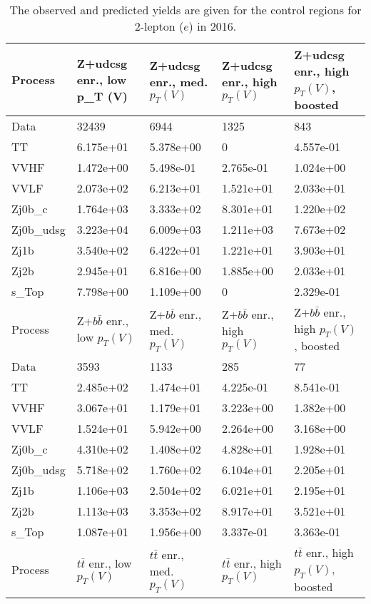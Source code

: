 \begin{table}
\centering
\caption[2016 2-lepton ($e$) control region yields]{
                  The observed and predicted yields are given for the
                  control regions for 2-lepton ($e$) in 2016.
                  }
{\footnotesize
\begin{tabularx}{\textwidth}{|X|X|X|X|X|}
\hline
Process & Z+udcsg enr., low p_{T} (V) & Z+udcsg enr., med. $p_{T}(V)$ & Z+udcsg enr., high $p_{T}(V)$ & Z+udcsg enr., high $p_{T}(V)$, boosted \\
\hline
Data & 32439 & 6944 & 1325 & 843 \\
\hline
TT & 6.175e+01 & 5.378e+00 & 0 & 4.557e-01 \\
VVHF & 1.472e+00 & 5.498e-01 & 2.765e-01 & 1.024e+00 \\
VVLF & 2.073e+02 & 6.213e+01 & 1.521e+01 & 2.033e+01 \\
Zj0b\_c & 1.764e+03 & 3.333e+02 & 8.301e+01 & 1.220e+02 \\
Zj0b\_udsg & 3.223e+04 & 6.009e+03 & 1.211e+03 & 7.673e+02 \\
Zj1b & 3.540e+02 & 6.422e+01 & 1.221e+01 & 3.903e+01 \\
Zj2b & 2.945e+01 & 6.816e+00 & 1.885e+00 & 2.033e+01 \\
s\_Top & 7.798e+00 & 1.109e+00 & 0 & 2.329e-01 \\
\hline
\hline
Process & Z+$b\bar{b}$ enr., low $p_{T}(V)$ & Z+$b\bar{b}$ enr., med. $p_{T}(V)$ & Z+$b\bar{b}$ enr., high $p_{T}(V)$ & Z+$b\bar{b}$ enr., high $p_{T}(V)$, boosted \\
\hline
Data & 3593 & 1133 & 285 & 77 \\
\hline
TT & 2.485e+02 & 1.474e+01 & 4.225e-01 & 8.541e-01 \\
VVHF & 3.067e+01 & 1.179e+01 & 3.223e+00 & 1.382e+00 \\
VVLF & 1.524e+01 & 5.942e+00 & 2.264e+00 & 3.168e+00 \\
Zj0b\_c & 4.310e+02 & 1.408e+02 & 4.828e+01 & 1.928e+01 \\
Zj0b\_udsg & 5.718e+02 & 1.760e+02 & 6.104e+01 & 2.205e+01 \\
Zj1b & 1.106e+03 & 2.504e+02 & 6.021e+01 & 2.195e+01 \\
Zj2b & 1.113e+03 & 3.353e+02 & 8.917e+01 & 3.521e+01 \\
s\_Top & 1.087e+01 & 1.956e+00 & 3.337e-01 & 3.363e-01 \\
\hline
\hline
Process & $t\bar{t}$ enr., low $p_{T}(V)$ & $t\bar{t}$ enr., med. $p_{T}(V)$ & $t\bar{t}$ enr., high $p_{T}(V)$ & $t\bar{t}$ enr., high $p_{T}(V)$, boosted \\

\end{tabularx}}
\end{table}
